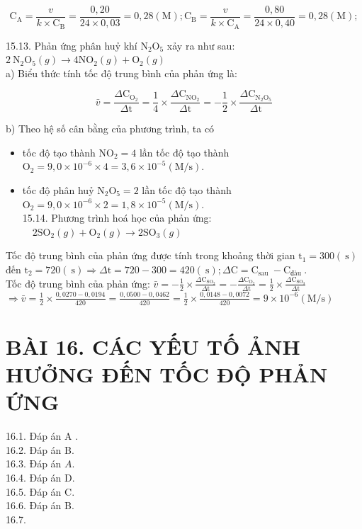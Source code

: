 \documentclass[10pt]{article}
\begin{document}
$$
\mathrm{C}_{\mathrm{A}}=\frac{v}{k \times \mathrm{C}_{\mathrm{B}}}=\frac{0,20}{24 \times 0,03}=0,28(\mathrm{M}) ; \mathrm{C}_{\mathrm{B}}=\frac{v}{k \times \mathrm{C}_{\mathrm{A}}}=\frac{0,80}{24 \times 0,40}=0,28(\mathrm{M}) ;
$$

15.13. Phản ứng phân huỷ khí $\mathrm{N}_{2} \mathrm{O}_{5}$ xảy ra như sau: $2 \mathrm{~N}_{2} \mathrm{O}_{5}(g) \rightarrow 4 \mathrm{NO}_{2}(g)+\mathrm{O}_{2}(g)$\\
a) Biểu thức tính tốc độ trung bình của phản ứng là:

$$
\bar{v}=\frac{\Delta \mathrm{C}_{\mathrm{O}_{2}}}{\Delta \mathrm{t}}=\frac{1}{4} \times \frac{\Delta \mathrm{C}_{\mathrm{NO}_{2}}}{\Delta \mathrm{t}}=-\frac{1}{2} \times \frac{\Delta \mathrm{C}_{\mathrm{N}_{2} \mathrm{O}_{5}}}{\Delta \mathrm{t}}
$$

b) Theo hệ số cân bằng của phương trình, ta có

\begin{itemize}
  \item tốc độ tạo thành $\mathrm{NO}_{2}=4$ lần tốc độ tạo thành $\mathrm{O}_{2}=9,0 \times 10^{-6} \times 4=3,6 \times 10^{-5}(\mathrm{M} / \mathrm{s})$.
  \item tốc độ phân huỷ $\mathrm{N}_{2} \mathrm{O}_{5}=2$ lần tốc độ tạo thành $\mathrm{O}_{2}=9,0 \times 10^{-6} \times 2=1,8 \times 10^{-5}(\mathrm{M} / \mathrm{s})$.\\
15.14. Phương trình hoá học của phản ứng: $\quad 2 \mathrm{SO}_{2}(g)+\mathrm{O}_{2}(g) \rightarrow 2 \mathrm{SO}_{3}(g)$
\end{itemize}

Tốc độ trung bình của phản ứng được tính trong khoảng thời gian $\mathrm{t}_{1}=300(\mathrm{~s})$ đến $\mathrm{t}_{2}=720(\mathrm{~s}) \Rightarrow \Delta \mathrm{t}=720-300=420(\mathrm{~s}) ; \Delta \mathrm{C}=\mathrm{C}_{\text {sau }}-\mathrm{C}_{\text {đàu }}$.\\
Tốc độ trung bình của phản ứng: $\bar{v}=-\frac{1}{2} \times \frac{\Delta \mathrm{C}_{\mathrm{SO}_{2}}}{\Delta \mathrm{t}}=-\frac{\Delta \mathrm{C}_{\mathrm{O}_{2}}}{\Delta \mathrm{t}}=\frac{1}{2} \times \frac{\Delta \mathrm{C}_{\mathrm{SO}_{3}}}{\Delta \mathrm{t}}$\\
$\Rightarrow \bar{v}=\frac{1}{2} \times \frac{0,0270-0,0194}{420}=\frac{0,0500-0,0462}{420}=\frac{1}{2} \times \frac{0,0148-0,0072}{420}=9 \times 10^{-6}(\mathrm{M} / \mathrm{s})$

\section*{BÀI 16. CÁC YẾU TỐ ẢNH HƯỞNG ĐẾN TỐC ĐỘ PHẢN ỨNG}
16.1. Đáp án A .\\
16.2. Đáp án B.\\
16.3. Đáp án $A$.\\
16.4. Đáp án D.\\
16.5. Đáp án C.\\
16.6. Đáp án B.\\
16.7.
\end{document}
